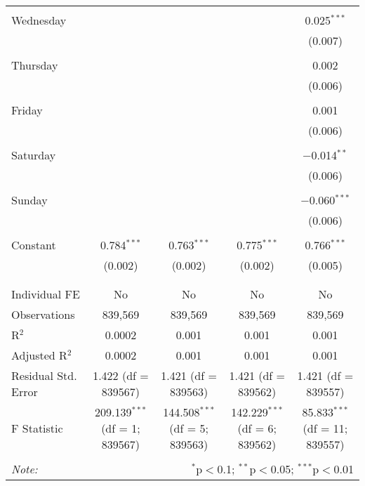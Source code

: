 \documentclass[
]{article}
\begin{document}
\begin{table}[!htbp]
{\begin{tabular}{@{\extracolsep{5pt}}lcccc}
  & & & & \\ 
 Wednesday &  &  &  & 0.025$^{***}$ \\ 
  &  &  &  & (0.007) \\ 
  & & & & \\ 
 Thursday &  &  &  & 0.002 \\ 
  &  &  &  & (0.006) \\ 
  & & & & \\ 
 Friday &  &  &  & 0.001 \\ 
  &  &  &  & (0.006) \\ 
  & & & & \\ 
 Saturday &  &  &  & $-$0.014$^{**}$ \\ 
  &  &  &  & (0.006) \\ 
  & & & & \\ 
 Sunday &  &  &  & $-$0.060$^{***}$ \\ 
  &  &  &  & (0.006) \\ 
  & & & & \\ 
 Constant & 0.784$^{***}$ & 0.763$^{***}$ & 0.775$^{***}$ & 0.766$^{***}$ \\ 
  & (0.002) & (0.002) & (0.002) & (0.005) \\ 
  & & & & \\ 
\hline \\[-1.8ex] 
Individual FE & No & No & No & No \\ 
Observations & 839,569 & 839,569 & 839,569 & 839,569 \\ 
R$^{2}$ & 0.0002 & 0.001 & 0.001 & 0.001 \\ 
Adjusted R$^{2}$ & 0.0002 & 0.001 & 0.001 & 0.001 \\ 
Residual Std. Error & 1.422 (df = 839567) & 1.421 (df = 839563) & 1.421 (df = 839562) & 1.421 (df = 839557) \\ 
F Statistic & 209.139$^{***}$ (df = 1; 839567) & 144.508$^{***}$ (df = 5; 839563) & 142.229$^{***}$ (df = 6; 839562) & 85.833$^{***}$ (df = 11; 839557) \\ 
\hline 
\hline \\[-1.8ex] 
\textit{Note:}  & \multicolumn{4}{r}{$^{*}$p$<$0.1; $^{**}$p$<$0.05; $^{***}$p$<$0.01} \\ 
\end{tabular}
} 
\end{table} 
\newpage
\end{document}
